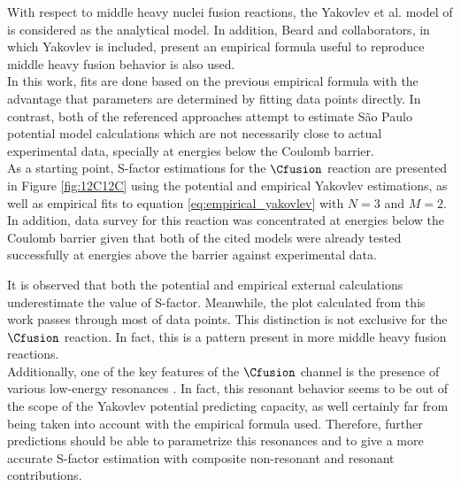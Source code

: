 \documentclass[openany]{book}
\begin{document}
With respect to middle heavy nuclei fusion reactions, the Yakovlev et al. model of \cite{yakovlev_beard_gasques_wiescher_2010} is considered as the analytical model. In addition, Beard and collaborators, in which Yakovlev is included, present an empirical formula useful to reproduce middle heavy fusion behavior \cite{beard_afanasjev_chamon_gasques_wiescher_yakovlev_2010} is also used. \\

In this work, fits are done based on the previous empirical formula  with the advantage that parameters are determined by fitting data points directly. In contrast, both of the referenced approaches attempt to estimate São Paulo potential model calculations which are not necessarily close to actual experimental data, specially at energies below the Coulomb barrier. \\

As a starting point, S-factor estimations for the $\Cfusion$ reaction are presented in Figure \ref{fig:12C12C} using the potential and empirical Yakovlev estimations, as well as empirical fits to equation \ref{eq:empirical_yakovlev} with $N = 3$ and $M = 2$. In addition, data survey for this reaction was concentrated at energies below the Coulomb barrier given that both of the cited models were already tested successfully at energies above the barrier against experimental data.


It is observed that both the potential and empirical external calculations underestimate the value of S-factor. Meanwhile, the plot calculated from this work passes through most of data points. This distinction is not exclusive for the $\Cfusion$ reaction. In fact, this is a pattern present in more middle heavy fusion reactions. \\

Additionally, one of the key features of the $\Cfusion$ channel is the presence of various low-energy resonances \cite{notani_esbensen_fang_bucher_davies_jiang_lamm_lin_ma_martin_et_2012}. In fact, this resonant behavior seems to be out of the scope of the Yakovlev potential predicting capacity, as well certainly far from being taken into account with the empirical formula used.  Therefore, further predictions should be able to parametrize this resonances and to give a more accurate S-factor estimation with composite non-resonant and resonant contributions. \\
\end{document}
